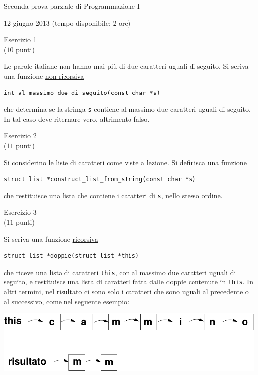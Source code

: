\documentclass[italian,12pt]{article}
\begin{document}
\begin{center}{\LARGE Seconda prova parziale di Programmazione I}\\
\begin{center}
  \Large 12 giugno 2013 (tempo disponibile: 2 ore)
\end{center}
\end{center}
\vspace*{2ex}
\begin{center}{\Large Esercizio 1}\\
($10$ punti)
\end{center}
Le parole italiane non hanno mai pi\`u di due caratteri uguali di seguito. Si scriva una funzione
\underline{non ricorsiva}
%
\begin{verbatim}
int al_massimo_due_di_seguito(const char *s)
\end{verbatim}
%
che determina se la stringa \texttt{s} contiene al massimo due caratteri uguali di seguito.
In tal caso deve ritornare vero, altrimento falso.
%
\vspace*{2ex}
\begin{center}{\Large Esercizio 2}\\
($11$ punti)\end{center}
%
Si considerino le liste di caratteri come viste a lezione. Si definisca una funzione
%
\begin{verbatim}
struct list *construct_list_from_string(const char *s)
\end{verbatim}
%
che restituisce una lista che contiene i caratteri di \texttt{s}, nello stesso ordine.
%
\vspace*{2ex}
\begin{center}{\Large Esercizio 3}\\
($11$ punti)\end{center}
%
Si scriva una funzione \underline{ricorsiva}
%
\begin{verbatim}
struct list *doppie(struct list *this)
\end{verbatim}
%
che riceve una lista di caratteri \texttt{this}, con al massimo due caratteri uguali di seguito,
e restituisce una lista di caratteri fatta
dalle doppie contenute in \texttt{this}. In altri termini, nel risultato ci sono solo i caratteri
che sono uguali al precedente o al successivo, come nel seguente esempio:
%
\begin{center}
\includegraphics[scale=0.8]{doppie.pdf}
\end{center}
\end{document}
